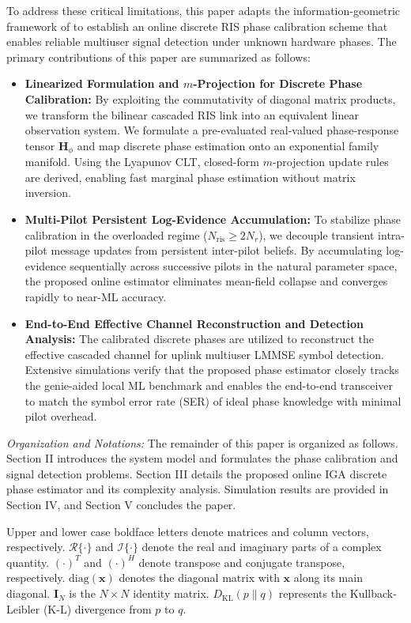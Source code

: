 \documentclass[conference]{IEEEtran}
\begin{document}
To address these critical limitations, this paper adapts the information-geometric framework of \cite{b1} to establish an online discrete RIS phase calibration scheme that enables reliable multiuser signal detection under unknown hardware phases. The primary contributions of this paper are summarized as follows:
\begin{itemize}
	\item \textbf{Linearized Formulation and $m$-Projection for Discrete Phase Calibration:} By exploiting the commutativity of diagonal matrix products, we transform the bilinear cascaded RIS link into an equivalent linear observation system. We formulate a pre-evaluated real-valued phase-response tensor $\mathbf{H}_{\phi}$ and map discrete phase estimation onto an exponential family manifold. Using the Lyapunov CLT, closed-form $m$-projection update rules are derived, enabling fast marginal phase estimation without matrix inversion.
	\item \textbf{Multi-Pilot Persistent Log-Evidence Accumulation:} To stabilize phase calibration in the overloaded regime ($N_{\mathrm{ris}} \ge 2N_r$), we decouple transient intra-pilot message updates from persistent inter-pilot beliefs. By accumulating log-evidence sequentially across successive pilots in the natural parameter space, the proposed online estimator eliminates mean-field collapse and converges rapidly to near-ML accuracy.
	\item \textbf{End-to-End Effective Channel Reconstruction and Detection Analysis:} The calibrated discrete phases are utilized to reconstruct the effective cascaded channel for uplink multiuser LMMSE symbol detection. Extensive simulations verify that the proposed phase estimator closely tracks the genie-aided local ML benchmark and enables the end-to-end transceiver to match the symbol error rate (SER) of ideal phase knowledge with minimal pilot overhead.
\end{itemize}

\textit{Organization and Notations:} The remainder of this paper is organized as follows. Section II introduces the system model and formulates the phase calibration and signal detection problems. Section III details the proposed online IGA discrete phase estimator and its complexity analysis. Simulation results are provided in Section IV, and Section V concludes the paper.

Upper and lower case boldface letters denote matrices and column vectors, respectively. $\mathcal{R}\{\cdot\}$ and $\mathcal{I}\{\cdot\}$ denote the real and imaginary parts of a complex quantity. $(\cdot)^T$ and $(\cdot)^H$ denote transpose and conjugate transpose, respectively. $\mathrm{diag}(\mathbf{x})$ denotes the diagonal matrix with $\mathbf{x}$ along its main diagonal. $\mathbf{I}_N$ is the $N \times N$ identity matrix. $D_{\mathrm{KL}}(p \parallel q)$ represents the Kullback-Leibler (K-L) divergence from $p$ to $q$.
\end{document}
